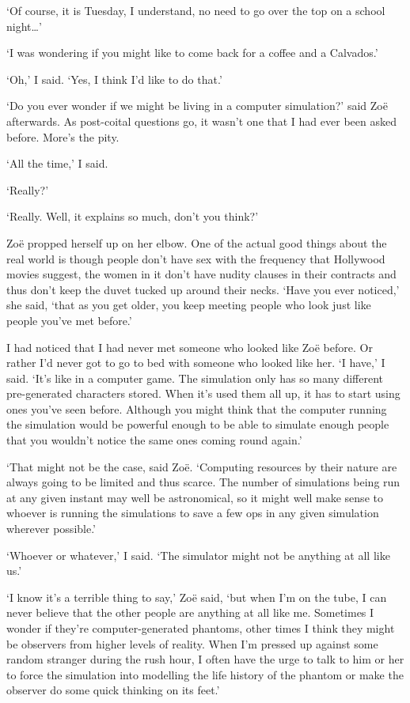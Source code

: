 `Of course, it is Tuesday, I understand, no need to go over the top
on a school night\dots'

`I was wondering if you might like to come back for a coffee and a Calvados.'

`Oh,' I said. `Yes, I think I'd like to do that.'

\vskip 1cm

`Do you ever wonder if we might be living in a computer simulation?'
said Zoë afterwards. As post-coital questions go, it wasn't one
that I had ever been asked before. More's the pity.

`All the time,' I said.

`Really?'

`Really. Well, it explains so much, don't you think?'

Zoë propped herself up on her elbow. One of the actual good things
about the real world is though people don't have sex with the
frequency that Hollywood movies suggest, the women in it don't have
nudity clauses in their contracts and thus don't keep the duvet
tucked up around their necks. `Have you ever noticed,' she said,
`that as you get older, you keep meeting people who look just like
people you've met before.'

I had noticed that I had never met someone who looked like Zoë
before. Or rather I'd never got to go to bed with someone who looked
like her. `I have,' I said. `It's like in a computer game. The
simulation only has so many different pre-generated characters
stored. When it's used them all up, it has to start using ones
you've seen before. Although you might think that the computer
running the simulation would be powerful enough to be able to
simulate enough people that you wouldn't notice the same ones coming
round again.'

`That might not be the case, said Zoë. `Computing resources by their nature
are always going to be limited and thus scarce. The number of
simulations being run at any given instant may well be
astronomical, so it might well make sense to whoever is running the
simulations to save a few ops in any given simulation wherever
possible.'

`Whoever or {\twelveit whatever},' I said. `The simulator might not
be anything at all like us.'

`I know it's a terrible thing to say,' Zoë said, `but when I'm
on the tube, I can never believe that the other people are anything
at all like me. Sometimes I wonder if they're computer-generated
phantoms, other times I think they might be observers from higher
levels of reality. When I'm pressed up against some random stranger
during the rush hour, I often have the urge to talk to him or her to
force the simulation into modelling the life history of the phantom
or make the observer do some quick thinking on its feet.'

